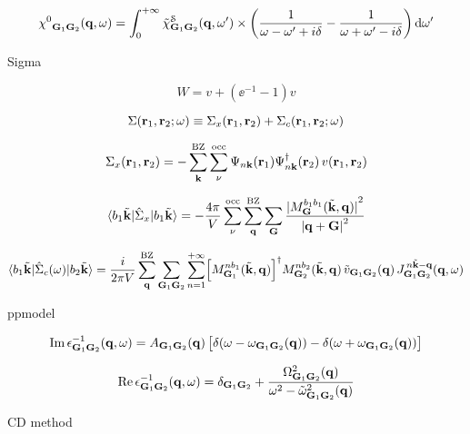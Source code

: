 \documentclass[a4paper,reqno,11pt,twoside]{book}
\begin{document}
\begin{equation}
\label{eq:chi0_Hilbert_transform}
 {{{{\chi^0}}}}_{{\bf G}_1{\bf G}_2} ({\bf q},\omega) = 
 \int_0^{+\infty} {{\tilde\chi}}^{\mathcal{S}}_{{\bf G}_1{\bf G}_2} ({\bf q},\omega') 
 \times \biggl(\frac{1}{\omega-\omega'+i\delta}-\frac{1}{\omega+\omega'-i\delta}\biggr){\,\text{d}}\omega'
\end{equation}


Sigma


\begin{equation}
W = v + (\ee^{-1}-1) v
\end{equation}

\begin{equation}
\Sigma({\bf r}_1,{\bf r}_2;\omega) \equiv \Sigma_x({\bf r}_1,{\bf r}_2) + \Sigma_c({\bf r}_1,{\bf r}_2;\omega)
\end{equation}

\begin{equation}\label{eq:Sigma_x}
\Sigma_x({\bf r}_1,{\bf r}_2)=  
-\sum_{\bf k}^{{\text{BZ}}} \sum_\nu^\text{occ} \Psi_{n{\bf k}}({\bf r}_1){\Psi^\dagger_{n{\bf k}}}({\bf r}_2)\,{v}({\bf r}_1,{\bf r}_2)
\end{equation}


\begin{equation}
\label{eq:diag_mat_el_Sigma_x}
 \langle b_1\tilde{{\bf k}}|{\hat\Sigma}_x|b_1\tilde{{\bf k}}\rangle =
 -\dfrac{{4\pi}}{V} \sum_{\nu}^{\text{occ}} \sum_{\bf q}^{{\text{BZ}}} \sum_{{\bf G}}
  \dfrac{{\lvert M_{\bf G}^{b_1b_1}(\tilde{{\bf k}},{\bf q})\rvert}^2}{{\lvert{\bf q}+{\bf G}\rvert}^2}
\end{equation}

\begin{equation}
\label{eq:mat_el_Sigma_c}
\langle b_1\tilde{{\bf k}}|{\hat\Sigma}_c(\omega)|b_2\tilde{{\bf k}}\rangle = 
\dfrac{i}{{2\pi} V}
\sum_{\bf q}^{{\text{BZ}}} \sum_{{\bf G}_1{\bf G}_2}\sum_{n=1}^{+\infty}
\Bigl[M_{{\bf G}_1}^{nb_1}(\tilde{{\bf k}},{\bf q})\Bigr]^\dagger M_{{\bf G}_2}^{nb_2}(\tilde{{\bf k}},{\bf q})\,\tilde v_{{\bf G}_1 {\bf G}_2}({\bf q})\,
J_{{\bf G}_1{\bf G}_2}^{\,n \tilde{{\bf k}}-{\bf q}}({\bf q},\omega)
\end{equation}


 ppmodel

\begin{equation}
\label{eq:ppmodel_imag}
\text{Im}\,\epsilon^{-1}_{{\bf G}_1{\bf G}_2}({\bf q},\omega) = 
A_{{\bf G}_1{\bf G}_2}({\bf q})\,
\bigl[
\delta(\omega-\omega_{{\bf G}_1{\bf G}_2}({\bf q})) - 
\delta(\omega+\omega_{{\bf G}_1{\bf G}_2}({\bf q}))
\bigr]
\end{equation}

\begin{equation}
\label{eq:ppmodel_real}
\text{Re}\,\epsilon^{-1}_{{\bf G}_1 {\bf G}_2} ({\bf q},\omega) = 
\delta_{{\bf G}_1 {\bf G}_2} + \dfrac{\Omega_{{\bf G}_1{\bf G}_2}^2({\bf q})}{\omega^2-\tilde\omega^2_{{\bf G}_1{\bf G}_2}({\bf q})}
\end{equation}


 CD method
\end{document}
